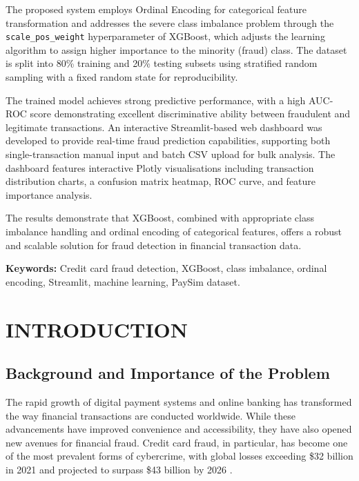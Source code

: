 \documentclass[12pt,a4paper]{report}
\begin{document}
The proposed system employs Ordinal Encoding for categorical feature transformation and addresses the severe class imbalance problem through the \texttt{scale\_pos\_weight} hyperparameter of XGBoost, which adjusts the learning algorithm to assign higher importance to the minority (fraud) class. The dataset is split into 80\% training and 20\% testing subsets using stratified random sampling with a fixed random state for reproducibility.

The trained model achieves strong predictive performance, with a high AUC-ROC score demonstrating excellent discriminative ability between fraudulent and legitimate transactions. An interactive Streamlit-based web dashboard was developed to provide real-time fraud prediction capabilities, supporting both single-transaction manual input and batch CSV upload for bulk analysis. The dashboard features interactive Plotly visualisations including transaction distribution charts, a confusion matrix heatmap, ROC curve, and feature importance analysis.

The results demonstrate that XGBoost, combined with appropriate class imbalance handling and ordinal encoding of categorical features, offers a robust and scalable solution for fraud detection in financial transaction data.

\textbf{Keywords:} Credit card fraud detection, XGBoost, class imbalance, ordinal encoding, Streamlit, machine learning, PaySim dataset.

\clearpage
{}

\chapter{INTRODUCTION}

\section{Background and Importance of the Problem}

The rapid growth of digital payment systems and online banking has transformed the way financial transactions are conducted worldwide. While these advancements have improved convenience and accessibility, they have also opened new avenues for financial fraud. Credit card fraud, in particular, has become one of the most prevalent forms of cybercrime, with global losses exceeding \$32 billion in 2021 and projected to surpass \$43 billion by 2026 \cite{nilsonreport2022}.
\end{document}

